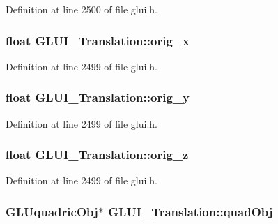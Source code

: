 Definition at line 2500 of file glui.\+h.

\hypertarget{class_g_l_u_i___translation_a112ad0d95aef6ccd325d228225313926}{
\subsubsection[{orig\+\_\+x}]{\setlength{\rightskip}{0pt plus 5cm}float G\+L\+U\+I\+\_\+\+Translation\+::orig\+\_\+x}}\label{class_g_l_u_i___translation_a112ad0d95aef6ccd325d228225313926}


Definition at line 2499 of file glui.\+h.

\hypertarget{class_g_l_u_i___translation_aaa8ec31a5c1590a52366731b1e2bf372}{
\subsubsection[{orig\+\_\+y}]{\setlength{\rightskip}{0pt plus 5cm}float G\+L\+U\+I\+\_\+\+Translation\+::orig\+\_\+y}}\label{class_g_l_u_i___translation_aaa8ec31a5c1590a52366731b1e2bf372}


Definition at line 2499 of file glui.\+h.

\hypertarget{class_g_l_u_i___translation_abfdf3200eb1bb7523ca2806f30836c18}{
\subsubsection[{orig\+\_\+z}]{\setlength{\rightskip}{0pt plus 5cm}float G\+L\+U\+I\+\_\+\+Translation\+::orig\+\_\+z}}\label{class_g_l_u_i___translation_abfdf3200eb1bb7523ca2806f30836c18}


Definition at line 2499 of file glui.\+h.

\hypertarget{class_g_l_u_i___translation_a8c70c62612841d36e7c7a85393f90790}{
\subsubsection[{quad\+Obj}]{\setlength{\rightskip}{0pt plus 5cm}G\+L\+Uquadric\+Obj$\ast$ G\+L\+U\+I\+\_\+\+Translation\+::quad\+Obj}}\label{class_g_l_u_i___translation_a8c70c62612841d36e7c7a85393f90790}


